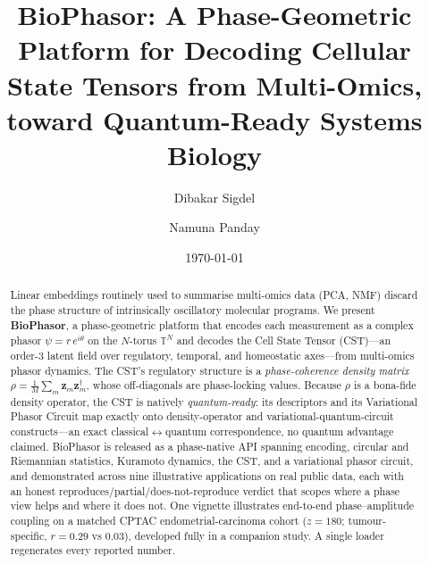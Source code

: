 \documentclass[preprint,12pt,amsmath,amssymb,superscriptaddress,floatfix]{revtex4-2}
\begin{document}

\title{BioPhasor: A Phase-Geometric Platform for Decoding Cellular State Tensors from Multi-Omics, toward Quantum-Ready Systems Biology}

\author{Dibakar Sigdel}
\author{Namuna Panday}

\date{\today}

\begin{abstract}
Linear embeddings routinely used to summarise multi-omics data (PCA, NMF)
discard the phase structure of intrinsically oscillatory molecular programs. We
present \textbf{BioPhasor}, a phase-geometric platform that encodes each
measurement as a complex phasor $\psi = r\,e^{i\theta}$ on the $N$-torus
$\mathbb{T}^N$ and decodes the Cell State Tensor (CST)---an order-3 latent field
over regulatory, temporal, and homeostatic axes---from multi-omics phasor
dynamics. The CST's regulatory structure is a \emph{phase-coherence density
matrix} $\rho=\frac1M\sum_m\boldsymbol z_m\boldsymbol z_m^{\dagger}$, whose
off-diagonals are phase-locking values. Because $\rho$ is a bona-fide density
operator, the CST is natively \emph{quantum-ready}: its descriptors and its
Variational Phasor Circuit map exactly onto density-operator and
variational-quantum-circuit constructs---an exact
classical$\leftrightarrow$quantum correspondence, no quantum advantage claimed. BioPhasor is released as a phase-native API spanning encoding, circular and
Riemannian statistics, Kuramoto dynamics, the CST, and a variational phasor
circuit, and demonstrated across nine illustrative applications on real public
data, each with an honest reproduces/partial/does-not-reproduce verdict that
scopes where a phase view helps and where it does not. One vignette illustrates
end-to-end phase--amplitude coupling on a matched CPTAC endometrial-carcinoma
cohort ($z=180$; tumour-specific, $r=0.29$ vs $0.03$), developed fully in a
companion study. A single loader regenerates every reported number.
\end{abstract}

\end{document}

